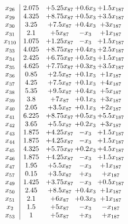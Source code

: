 \documentclass[11pt]{article}
\begin{document}
\[\begin{array}{c| c c@{\hskip 2pt} c@{\hskip 2pt} c@{\hskip 2pt} }
 x_{26}   &  2.075 & + 5.25 x_{87} & + 0.6 x_{3} & + 1.5 x_{187}\\
 x_{29}   &  4.325 & + 8.75 x_{87} & + 0.5 x_{3} & + 3.5 x_{187}\\
 x_{30}   &  3.25 & + 7.5 x_{87} & + 0.4 x_{3} & + 3 x_{187}\\
 x_{31}   &  2.1 & + 5 x_{87} & - x_{3} & + 1 x_{187}\\
 x_{110}   &  1.075 & + 1.25 x_{87} & - x_{3} & + 1.5 x_{187}\\
 x_{33}   &  4.025 & + 8.75 x_{87} & + 0.4 x_{3} & + 2.5 x_{187}\\
 x_{34}   &  2.425 & + 6.75 x_{87} & + 0.5 x_{3} & + 1.5 x_{187}\\
 x_{35}   &  4.625 & + 7.75 x_{87} & + 0.3 x_{3} & + 3.5 x_{187}\\
 x_{36}   &  0.85 & + 2.5 x_{87} & + 0.1 x_{3} & + 1 x_{187}\\
 x_{37}   &  4.25 & + 7.5 x_{87} & + 0.1 x_{3} & + 4 x_{187}\\
 x_{38}   &  5.35 & + 9.5 x_{87} & + 0.4 x_{3} & + 5 x_{187}\\
 x_{39}   &  3.8 & + 7 x_{87} & + 0.1 x_{3} & + 3 x_{187}\\
 x_{40}   &  2.05 & + 3.5 x_{87} & + 0.1 x_{3} & + 2 x_{187}\\
 x_{41}   &  6.225 & + 8.75 x_{87} & + 0.5 x_{3} & + 5.5 x_{187}\\
 x_{42}   &  3.65 & + 5.5 x_{87} & + 0.2 x_{3} & + 3 x_{187}\\
 x_{43}   &  1.875 & + 4.25 x_{87} & - x_{3} & + 1.5 x_{187}\\
 x_{44}   &  1.875 & + 4.25 x_{87} & - x_{3} & + 1.5 x_{187}\\
 x_{45}   &  4.325 & + 5.75 x_{87} & + 0.2 x_{3} & + 4.5 x_{187}\\
 x_{46}   &  1.875 & + 4.25 x_{87} & - x_{3} & + 1.5 x_{187}\\
 x_{47}   &  1.95 & + 5.5 x_{87} & - x_{3} & + 1 x_{187}\\
 x_{57}   &  0.15 & + 3.5 x_{87} & +  x_{3} & +  x_{187}\\
 x_{49}   &  1.425 & + 3.75 x_{87} & - x_{3} & + 0.5 x_{187}\\
 x_{50}   &  2.45 & + 8.5 x_{87} & + 0.4 x_{3} & + 1 x_{187}\\
 x_{51}   &  2.1 & + 6 x_{87} & + 0.3 x_{3} & + 1 x_{187}\\
 x_{2}   &  1.5 & + 5 x_{87} & - x_{3} & - x_{187}\\
 x_{53}   &  1 & + 5 x_{87} & +  x_{3} & +  x_{187}\\

\end{array}\]
\end{document}
